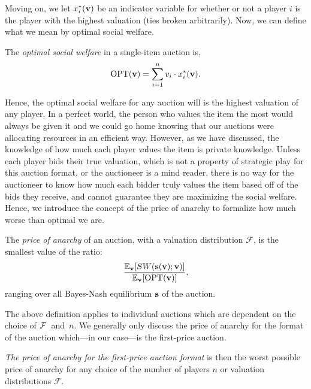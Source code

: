 \documentclass[12pt,twoside]{reedthesis}
\begin{document}
Moving on, we let $x^*_i(\textbf{v})$ be an indicator variable for whether or not a player $i$ is the player with the highest valuation (ties broken arbitrarily). Now, we can define what we mean by optimal social welfare. 

\begin{dfn}
	The {\em optimal social welfare} in a single-item auction is, 
	$$ \text{OPT}( \textbf{v}) = \sum_{i=1}^{n} v_i \cdot x^*_i (\textbf{v}).$$
\end{dfn}
Hence, the optimal social welfare for any auction will is the highest valuation of any player. In a perfect world, the person who values the item the most would always be given it and we could go home knowing that our auctions were allocating resources in an efficient way. However, as we have discussed, the knowledge of how much each player values the item is private knowledge. Unless each player bids their true valuation, which is not a property of strategic play for this auction format, or the auctioneer is a mind reader, there is no way for the auctioneer to know how much each bidder truly values the item based off of the bids they receive, and cannot guarantee they are maximizing the social welfare. Hence, we introduce the concept of the price of anarchy to formalize how much worse than optimal we are.
 
\begin{dfn}
	The \textit{price of anarchy} of an auction, with a valuation distribution $\mathcal{F}$, is the smallest value of the ratio:
	\begin{equation}
	\frac{\mathbb{E}_{\textbf{v}} [SW(\textbf{s}(\textbf{v});\textbf{v})]}{\mathbb{E}_{\textbf{v}}[\text{OPT}(\textbf{v})]},
	\end{equation}
	ranging over all Bayes-Nash equilibrium $\textbf{s}$ of the auction.
	\label{dfn:POA}
\end{dfn}

The above definition applies to individual auctions which are dependent on the choice of $\mathcal{F}$~and~$n$. We generally only discuss the price of anarchy for the format of the auction which---in our case---is the first-price auction.

\begin{dfn} 
{\em The price of anarchy for the first-price auction format} is then the worst possible price of anarchy for any choice of the number of players $n$ or valuation distributions $\mathcal{F}$.
\label{dfn:FormatPOA}
\end{dfn}
\end{document}
